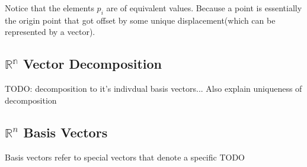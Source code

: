 Notice that the elements $p_i$ are of equivalent values. Because a point is essentially the origin point
that got offset by some unique displacement(which can be represented by a vector).


\subsection{$\mathbb{R^n}$ Vector Decomposition}
TODO: decomposition to it's indivdual basis vectors...
Also explain uniqueness of decomposition


\subsection{$\mathbb{R}^n$ Basis Vectors}
Basis vectors refer to special vectors that denote a specific
TODO
